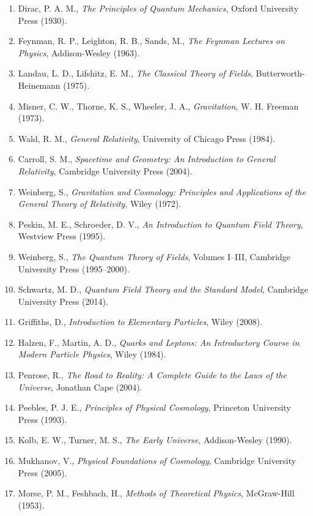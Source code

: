\documentclass[12pt,oneside]{book}
\begin{document}
\begin{enumerate}
    \item Dirac, P. A. M., \textit{The Principles of Quantum Mechanics}, Oxford University Press (1930).
    \item Feynman, R. P., Leighton, R. B., Sands, M., \textit{The Feynman Lectures on Physics}, Addison-Wesley (1963).
    \item Landau, L. D., Lifshitz, E. M., \textit{The Classical Theory of Fields}, Butterworth-Heinemann (1975).
    \item Misner, C. W., Thorne, K. S., Wheeler, J. A., \textit{Gravitation}, W. H. Freeman (1973).
    \item Wald, R. M., \textit{General Relativity}, University of Chicago Press (1984).
    \item Carroll, S. M., \textit{Spacetime and Geometry: An Introduction to General Relativity}, Cambridge University Press (2004).
    \item Weinberg, S., \textit{Gravitation and Cosmology: Principles and Applications of the General Theory of Relativity}, Wiley (1972).
    \item Peskin, M. E., Schroeder, D. V., \textit{An Introduction to Quantum Field Theory}, Westview Press (1995).
    \item Weinberg, S., \textit{The Quantum Theory of Fields}, Volumes I--III, Cambridge University Press (1995--2000).
    \item Schwartz, M. D., \textit{Quantum Field Theory and the Standard Model}, Cambridge University Press (2014).
    \item Griffiths, D., \textit{Introduction to Elementary Particles}, Wiley (2008).
    \item Halzen, F., Martin, A. D., \textit{Quarks and Leptons: An Introductory Course in Modern Particle Physics}, Wiley (1984).
    \item Penrose, R., \textit{The Road to Reality: A Complete Guide to the Laws of the Universe}, Jonathan Cape (2004).
    \item Peebles, P. J. E., \textit{Principles of Physical Cosmology}, Princeton University Press (1993).
    \item Kolb, E. W., Turner, M. S., \textit{The Early Universe}, Addison-Wesley (1990).
    \item Mukhanov, V., \textit{Physical Foundations of Cosmology}, Cambridge University Press (2005).
    \item Morse, P. M., Feshbach, H., \textit{Methods of Theoretical Physics}, McGraw-Hill (1953).
\end{enumerate}
\end{document}
